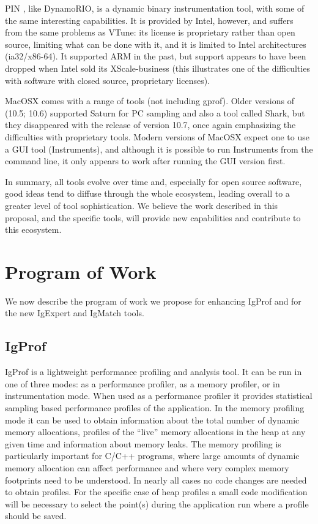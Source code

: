 \documentclass[notitlepage,letter,12pt]{article}
\begin{document}
PIN \cite{PIN}, like DynamoRIO, is a dynamic binary instrumentation tool,
with some of the same interesting capabilities. It is provided by Intel,
however, and suffers from the same problems as VTune: its license is
proprietary rather than open source, limiting what can be done with it, and
it is limited to Intel architectures (ia32/x86-64). It supported ARM
in the past, but support appears to have been dropped when Intel sold 
its XScale-business (this illustrates one of the difficulties with 
software with closed source, proprietary licenses).

MacOSX comes with a range of tools (not including gprof). Older
versions of (10.5; 10.6) supported Saturn for PC sampling and also
a tool called Shark, but they disappeared with the release of version 10.7,
once again emphasizing the difficulties with proprietary
tools. Modern versions of MacOSX expect one to use a GUI tool
(Instruments), and although it is possible to run Instruments from
the command line, it only appears to work after running the GUI
version first.

In summary, all tools evolve over time and, especially for open source 
software, good ideas tend to diffuse through the whole ecosystem, leading 
overall to a greater level of tool sophistication. We believe the work
described in this proposal, and the specific tools, will provide
new capabilities and contribute to this ecosystem.



\section{Program of Work}

We now describe the program of work we propose for enhancing IgProf
and for the new IgExpert and IgMatch tools.

\subsection{IgProf}

IgProf is a lightweight performance profiling and analysis tool. It can be
run in one of three modes: as a performance profiler, as a memory profiler, or 
in instrumentation mode. When used as a performance profiler it provides 
statistical sampling based performance profiles of the application. In the
memory profiling mode it can be used to obtain information about the total
number of dynamic memory allocations, profiles of the ``live'' memory 
allocations in the heap at any given time and information about memory 
leaks. The memory profiling is particularly important for C/C++ programs, 
where large amounts of dynamic memory allocation can affect performance and
where very complex memory footprints need to be understood.
In nearly all cases no code changes are needed to obtain profiles.
For the specific case of heap profiles a small code modification will
be necessary to select the point(s) during the application run where
a profile should be saved. 
\end{document}
